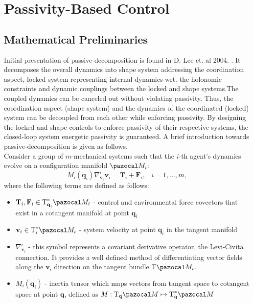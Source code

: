 \section{Passivity-Based Control} \label{section:pssivity}
\subsection{Mathematical Preliminaries}
Initial presentation of passive-decomposition is found in D. Lee et. al 2004. \cite{passive-decomp-mechanical-coord-req}. It decomposes the overall dynamics into shape system addressing the coordination aspect, locked system representing internal dynamics wrt. the holonomic constraints and dynamic couplings between the locked and shape systems.The coupled dynamics can be canceled out without violating passivity. Thus, the coordination aspect (shape system) and the dynamics of the coordinated (locked) system can be decoupled from each other while enforcing passivity. By designing the locked and shape controls to enforce passivity  of their respective systems, the closed-loop system energetic passivity is guaranteed. A brief introduction towards passive-decomposition is given as follows. \\
Consider a group of $m$-mechanical systems such that the $i$-th agent's dynamics evolve on a configuration manifold $\Ma_i$:
	\begin{equation}
	M_i(\textbf{q}_i)\nabla^i_{\textbf{v}_i} \textbf{v}_i = \textbf{T}_i + \textbf{F}_i, \;\;\; i = 1,...,m,
\end{equation}
where the following terms are defined as follows:
\begin{itemize}
	\item $\textbf{T}_i, \textbf{F}_i\in\text{T}_{\textbf{q}_i}^*\Ma_i$ - control and environmental force covectors that exist in a cotangent manifold at point $\textbf{q}_i$
	
	\item $\textbf{v}_i \in \text{T}_i^{*}\Ma_i$ - system velocity at point $\textbf{q}_i$ in the tangent manifold
	
	\item $\nabla^i_{\textbf{v}_i}$ - this symbol represents a covariant derivative operator, the Levi-Civita connection. It provides a well defined method of differentiating vector fields along the ${\textbf{v}_i}$ direction on the tangent bundle $\text{T}\Ma_i$.
	
	\item $M_i(\textbf{q}_i)$ - inertia tensor which maps vectors from tangent space to cotangent space at point $\textbf{q}$, defined as $M:\text{T}_{\textbf{q}}\Ma \mapsto \text{T}_{\textbf{q}}^*\Ma$
\end{itemize}

